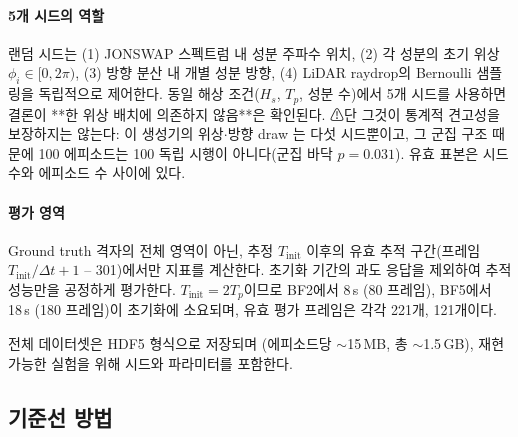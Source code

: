 \documentclass[11pt]{report}
\numberwithin{equation}{chapter}
\numberwithin{figure}{chapter}
\numberwithin{table}{chapter}
\begin{document}
\paragraph{5개 시드의 역할}
랜덤 시드는 (1) JONSWAP 스펙트럼 내 성분 주파수 위치,
(2) 각 성분의 초기 위상 $\phi_i \in [0, 2\pi)$,
(3) 방향 분산 내 개별 성분 방향,
(4) LiDAR raydrop의 Bernoulli 샘플링을 독립적으로 제어한다.
동일 해상 조건($H_s$, $T_p$, 성분 수)에서 5개 시드를 사용하면 결론이 **한 위상 배치에
의존하지 않음**은 확인된다. ⚠단 그것이 통계적 견고성을 보장하지는 않는다: 이 생성기의
위상$\cdot$방향 draw 는 다섯 시드뿐이고, 그 군집 구조 때문에 100 에피소드는 100 독립
시행이 아니다(군집 바닥 $p = 0.031$). 유효 표본은 시드 수와 에피소드 수 사이에 있다.

\paragraph{평가 영역}
Ground truth 격자의 전체 영역이 아닌, 추정 $T_{\text{init}}$ 이후의
유효 추적 구간(프레임 $T_{\text{init}}/\Delta t + 1$ -- 301)에서만
지표를 계산한다. 초기화 기간의 과도 응답을 제외하여
추적 성능만을 공정하게 평가한다.
$T_{\text{init}} = 2T_p$이므로 BF2에서 8\,s (80 프레임),
BF5에서 18\,s (180 프레임)이 초기화에 소요되며,
유효 평가 프레임은 각각 221개, 121개이다.

전체 데이터셋은 HDF5 형식으로 저장되며
(에피소드당 $\sim$15\,MB, 총 $\sim$1.5\,GB),
재현 가능한 실험을 위해 시드와 파라미터를 포함한다.

\subsection{기준선 방법}
\label{sec:baselines}
\end{document}
